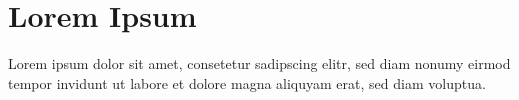 \documentclass[twoside,openright,draft]{scrreprt}
\begin{document}
\section{Lorem Ipsum}
Lorem ipsum dolor sit amet, consetetur sadipscing elitr, sed diam nonumy eirmod 
tempor invidunt ut labore et dolore magna aliquyam erat, sed diam voluptua. 
\end{document}
